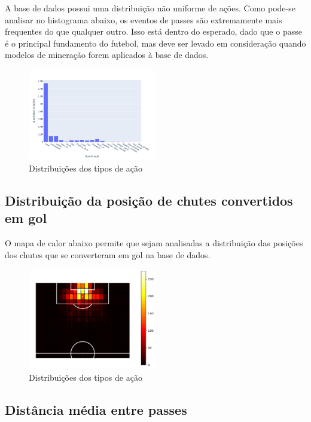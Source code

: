 \documentclass{article}
\begin{document}
A base de dados possui uma distribuição não uniforme de ações. Como pode-se
analisar no histograma abaixo, os eventos de passes são extremamente mais
frequentes do que qualquer outro. Isso está dentro do esperado, dado que o
passe é o principal fundamento do futebol, mas deve ser levado em consideração
quando modelos de mineração forem aplicados à base de dados.

\begin{figure}[H]
	\centering
	\includegraphics[width=0.5\textwidth]{images/action_distribution.png}
	\caption{Distribuições dos tipos de ação}
	\label{fig:action_distribution}
\end{figure}

\subsection{Distribuição da posição de chutes convertidos em gol}

O mapa de calor abaixo permite que sejam analisadas a distribuição das posições dos chutes que se converteram em gol
na base de dados.

\begin{figure}[H]
	\centering
	\includegraphics[width=0.5\textwidth]{images/goal_position_heatmap.png}
	\caption{Distribuições dos tipos de ação}
	\label{fig:heatmap_goals}
\end{figure}

\subsection{Distância média entre passes}
\end{document}
